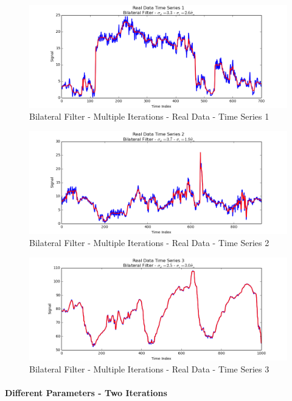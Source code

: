 \documentclass[11pt]{article}
\theoremstyle{definition}
\begin{document}
\begin{figure}
\centering
\includegraphics[width = 0.75 \textwidth]{ItrSameBilateralRealSignal1.png}
\caption{Bilateral Filter - Multiple Iterations - Real Data - Time Series 1}
\label{itrsamebilateralrealsignal1}
\end{figure}

\begin{figure}
\centering
\includegraphics[width = 0.75 \textwidth]{ItrSameBilateralRealSignal2.png}
\caption{Bilateral Filter - Multiple Iterations - Real Data - Time Series 2}
\label{itrsamebilateralrealsignal2}
\end{figure}

\begin{figure}
\centering
\includegraphics[width = 0.75 \textwidth]{ItrSameBilateralRealSignal3.png}
\caption{Bilateral Filter - Multiple Iterations - Real Data - Time Series 3}
\label{itrsamebilateralrealsignal3}
\end{figure}

\newpage

\paragraph{Different Parameters - Two Iterations}
\end{document}

